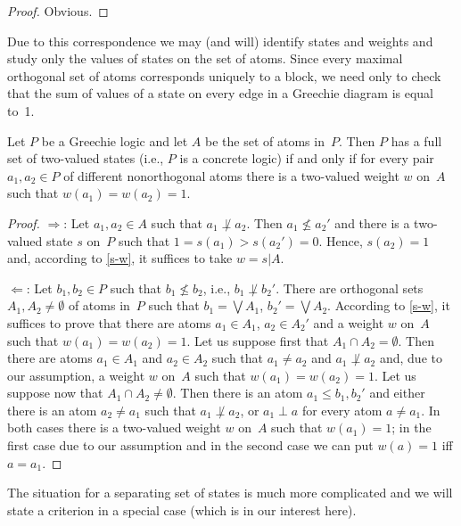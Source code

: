 \begin {proof}
Obvious.
\end {proof}


Due to this correspondence we may (and will) identify states and weights and
study only the values of states on the set of atoms. Since every maximal
orthogonal set of atoms corresponds uniquely to a block, we need only to
check that the sum of values of a state on every edge in a Greechie diagram
is equal to~1.


\begin {proposition} \label {full}
Let $P$ be a Greechie logic and let $A$ be the set of atoms in~$P$. Then $P$
has a full set of two-valued states (i.e., $P$ is a concrete logic) if and
only if for every pair $a_1,a_2 \in P$ of different nonorthogonal atoms
there is a two-valued weight $w$ on~$A$ such that $w(a_1) = w(a_2) = 1$.
\end {proposition}


\begin {proof}
$\Rightarrow$: Let $a_1,a_2 \in A$ such that $a_1 \not\perp a_2$. Then $a_1
\not\le a_2'$ and there is a two-valued state $s$ on~$P$ such that $1 =
s(a_1) > s(a_2') = 0$. Hence, $s(a_2)=1$ and, according to \ref{s-w}, it
suffices to take $w=s|A$.

$\Leftarrow$: Let $b_1,b_2 \in P$ such that $b_1 \not\le b_2$, i.e., $b_1
\not\perp b_2'$. There are orthogonal sets $A_1,A_2 \neq \emptyset$ of atoms
in~$P$ such that $b_1 = \bigvee A_1$, $b_2' = \bigvee A_2$. According to
\ref{s-w}, it suffices to prove that there are atoms $a_1 \in A_1$, $a_2\in
A_2'$ and a weight $w$ on~$A$ such that $w(a_1) = w(a_2) = 1$. Let us
suppose first that $A_1 \cap A_2 = \emptyset$. Then there are atoms $a_1 \in
A_1$ and $a_2 \in A_2$ such that $a_1 \neq a_2$ and $a_1 \not\perp a_2$ and,
due to our assumption, a weight $w$ on~$A$ such that $w(a_1) = w(a_2) = 1$.
Let us suppose now that $A_1 \cap A_2 \neq \emptyset$. Then there is an atom
$a_1 \le b_1,b_2'$ and either there is an atom $a_2 \neq a_1$ such that $a_1
\not\perp a_2$, or $a_1 \perp a$ for every atom $a \neq a_1$. In both cases
there is a two-valued weight $w$ on~$A$ such that $w(a_1)=1$; in the first
case due to our assumption and in the second case we can put $w(a)=1$ iff
$a=a_1$.
\end {proof}


The situation for a separating set of states is much more complicated and we
will state a criterion in a special case (which is in our interest here).


